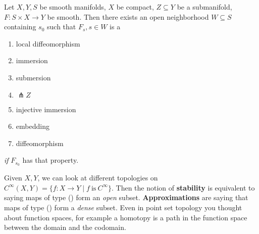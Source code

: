 \begin{theorem}
   Let $X,Y,S$ be smooth manifolds, $X$ be compact, $Z \subseteq Y$ be a submanifold, $F \colon S\times X \to Y$ be smooth. Then there exists an open neighborhood $W \subseteq S$ containing $s_0$ such that $F_s, s \in W$ is a
   \begin{enumerate}[label=(\roman*)]
       \setlength\itemsep{-.2em}
       \item local diffeomorphism
        \item immersion
        \item submersion
        \item $\pitchfork Z$
        \item injective immersion
        \item embedding
        \item diffeomorphism
   \end{enumerate} \emph{if} $F_{s_0}$ has that property.
\end{theorem}
\begin{remark}
    Given $X,Y$, we can look at different topologies on $C^{\infty}(X,Y)= \{f \colon X \to Y\mid f \ \text{is} \ C^{\infty}\} $. Then the notion of \textbf{stability} is equivalent to saying maps of type () form an \emph{open} subset. \textbf{Approximations} are saying that maps of type () form a \emph{dense} subset. Even in point set topology you thought about function spaces, for example a homotopy is a path in the function space between the domain and the codomain.
\end{remark}
